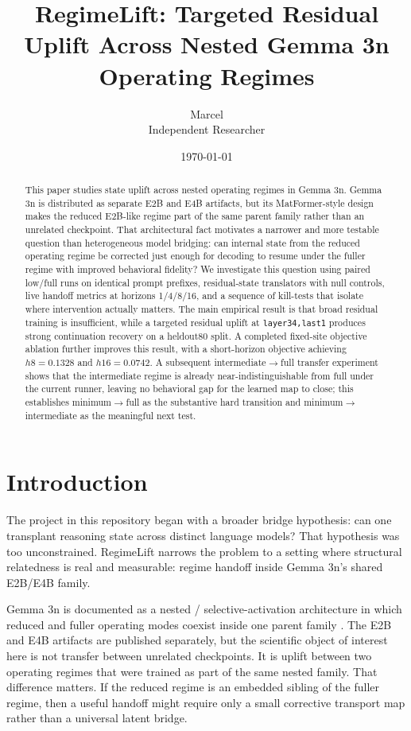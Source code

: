 \documentclass[11pt]{article}
\title{RegimeLift: Targeted Residual Uplift Across Nested Gemma 3n Operating Regimes}
\author{Marcel\\Independent Researcher}
\date{\today}
\newcommand{\method}[1]{\texttt{#1}}
\begin{document}
\maketitle

\begin{abstract}
This paper studies state uplift across nested operating regimes in Gemma 3n. Gemma 3n is distributed as separate E2B and E4B artifacts, but its MatFormer-style design makes the reduced E2B-like regime part of the same parent family rather than an unrelated checkpoint. That architectural fact motivates a narrower and more testable question than heterogeneous model bridging: can internal state from the reduced operating regime be corrected just enough for decoding to resume under the fuller regime with improved behavioral fidelity? We investigate this question using paired low/full runs on identical prompt prefixes, residual-state translators with null controls, live handoff metrics at horizons 1/4/8/16, and a sequence of kill-tests that isolate where intervention actually matters. The main empirical result is that broad residual training is insufficient, while a targeted residual uplift at \method{layer34,last1} produces strong continuation recovery on a heldout80 split. A completed fixed-site objective ablation further improves this result, with a short-horizon objective achieving $h8=0.1328$ and $h16=0.0742$. A subsequent intermediate$\rightarrow$full transfer experiment shows that the intermediate regime is already near-indistinguishable from full under the current runner, leaving no behavioral gap for the learned map to close; this establishes minimum$\rightarrow$full as the substantive hard transition and minimum$\rightarrow$intermediate as the meaningful next test.
\end{abstract}

\section{Introduction}
The project in this repository began with a broader bridge hypothesis: can one transplant reasoning state across distinct language models? That hypothesis was too unconstrained. RegimeLift narrows the problem to a setting where structural relatedness is real and measurable: regime handoff inside Gemma 3n's shared E2B/E4B family.

Gemma 3n is documented as a nested / selective-activation architecture in which reduced and fuller operating modes coexist inside one parent family \cite{gemma3n2025,mrl2022}. The E2B and E4B artifacts are published separately, but the scientific object of interest here is not transfer between unrelated checkpoints. It is uplift between two operating regimes that were trained as part of the same nested family. That difference matters. If the reduced regime is an embedded sibling of the fuller regime, then a useful handoff might require only a small corrective transport map rather than a universal latent bridge.
\end{document}
